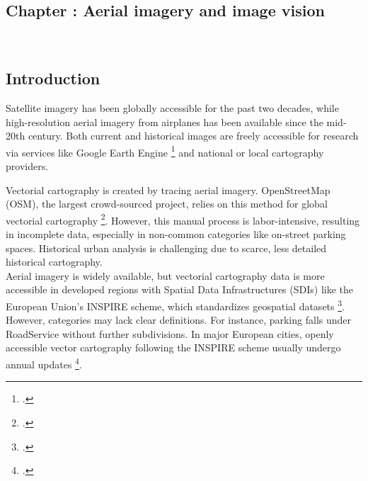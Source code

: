 \graphicspath{
    {figures_and_references/urban_surface_detection/}
    {figures_and_references/EELISA_conference/}
}

\renewcommand{\chapternametext}{Chapter \thechapter: Aerial imagery and image vision}

\begin{refsection}

\chapter{\chapternametext}
\

\renewcommand{\headingtextL}{}
\renewcommand{\headingtextR}{\chapternametext}

\begingroup
 \flushbottom
 \setlength{\parskip}{0pt plus 1fil}%
 \localtableofcontents 
\endgroup

\begingroup
 \flushbottom
 \setlength{\parskip}{0pt plus 1fil}%
 \locallistoffigures
\endgroup


\newpage

\setcounter{section}{0} 



\FloatBarrier

\renewcommand{\sectionnametext}{Introduction}
\renewcommand{\headingtextL}{\chapternametext}
\renewcommand{\headingtextR}{\thesection. \sectionnametext}
\section{\sectionnametext}

Satellite imagery has been globally accessible for the past two decades, while high-resolution aerial imagery from airplanes has been available since the mid-20th century. Both current and historical images are freely accessible for research via services like Google Earth Engine \footcite{gorelick_google_2017} and national or local cartography providers. 

Vectorial cartography is created by tracing aerial imagery. OpenStreetMap (OSM), the largest crowd-sourced project, relies on this method for global vectorial cartography \footcite{haklay_openstreetmap_2008}. However, this manual process is labor-intensive, resulting in incomplete data, especially in non-common categories like on-street parking spaces. Historical urban analysis is challenging due to scarce, less detailed historical cartography. \\


Aerial imagery is widely available, but vectorial cartography data is more accessible in developed regions with Spatial Data Infrastructures (SDIs) like the European Union’s INSPIRE scheme, which standardizes geospatial datasets \footcite{noauthor_directive_2007, minghini_comparing_2019}. However, categories may lack clear definitions. For instance, parking falls under RoadService without further subdivisions. 
In major European cities, openly accessible vector cartography following the INSPIRE scheme usually undergo  
annual updates \footcite{noauthor_city_nodate, noauthor_stadtvermessung_nodate,
paris_city_council_paris_nodate, 
noauthor_luftbilder_nodate, 
ayuntamiento_de_madrid_geoportal_nodate}. 


\end{refsection}
